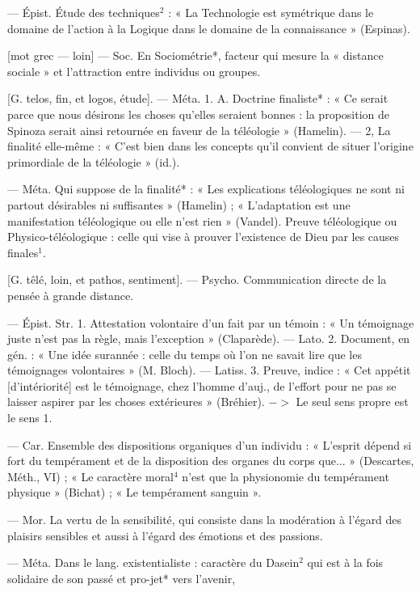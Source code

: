 \begin{itemize}[leftmargin=1cm, label=, itemsep=1pt]
 — Épist. Étude des
techniques$^2$ : « La Technologie est
symétrique dans le domaine de
l’action à la Logique dans le domaine
de la connaissance » (Espinas).

 [mot grec — loin] — Soc. En
Sociométrie*, facteur qui mesure la
« distance sociale » et l'attraction
entre individus ou groupes.

 [G. telos, fin, et logos, étude].
— Méta. 1. A. Doctrine finaliste* :
« Ce serait parce que nous désirons
les choses qu’elles seraient bonnes :
la proposition de Spinoza serait
ainsi retournée en faveur de la téléologie » (Hamelin). — 2, La finalité
elle-même : « C’est bien dans les
concepts qu'il convient de situer
l’origine primordiale de la téléologie » (id.).

 — Méta. Qui suppose de
la finalité* : « Les explications téléologiques ne sont ni partout désirables ni suffisantes » (Hamelin) ;
« L'adaptation est une manifestation téléologique ou elle n’est rien »
(Vandel). Preuve téléologique ou
Physico-téléologique : celle qui vise
à prouver l'existence de Dieu par
les causes finales$^1$.

 [G. têlé, loin, et pathos, sentiment]. — Psycho. Communication
directe de la pensée à grande distance.

 — Épist. Str. 1. Attestation volontaire d’un fait par un
témoin : « Un témoignage juste
n’est pas la règle, mais l'exception »
(Claparède). — Lato. 2. Document,
en gén. : « Une idée surannée : celle
du temps où l’on ne savait lire que
les témoignages volontaires »
(M. Bloch). — Latiss. 3. Preuve,
indice : « Cet appétit [d’intériorité]
est le témoignage, chez l’homme
d’auj., de l'effort pour ne pas se
laisser aspirer par les choses extérieures » (Bréhier). $->$ Le seul sens
propre est le sens 1.

 — Car. Ensemble des
dispositions organiques d’un individu : « L’esprit dépend si fort du
tempérament et de la disposition
des organes du corps que... » (Descartes, Méth., VI) ; « Le caractère
moral$^4$ n’est que la physionomie du
tempérament physique » (Bichat) ;
« Le tempérament sanguin ».

 — Mor. La vertu de la
sensibilité, qui consiste dans la modération à l'égard des plaisirs sensibles et aussi à l'égard des émotions
et des passions.

 — Méta. Dans le lang.
existentialiste : caractère du Dasein$^2$
qui est à la fois solidaire de son
passé et pro-jet* vers l'avenir,


\end{itemize}

